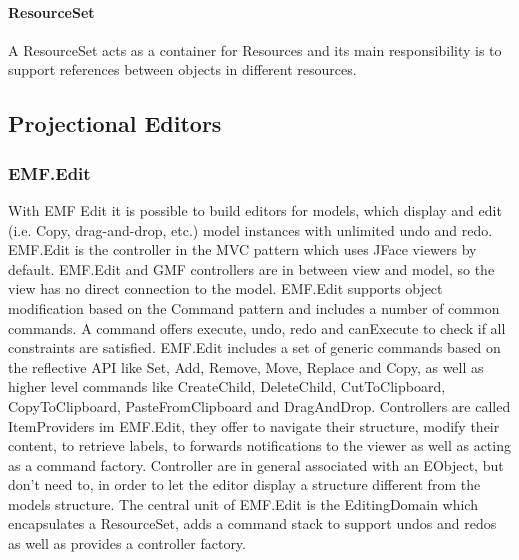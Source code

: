 \paragraph{ResourceSet}
A ResourceSet acts as a container for Resources and its main responsibility is to support references between objects in different resources. 

\subsection{Projectional Editors}
\subsubsection{EMF.Edit}
With EMF Edit it is possible to build editors for models, which display and edit (i.e. Copy, drag-and-drop, etc.) model instances with unlimited undo and redo. EMF.Edit is the controller in the MVC pattern which uses JFace viewers by default. EMF.Edit and GMF controllers are in between view and model, so the view has no direct connection to the model. EMF.Edit supports object modification based on the Command pattern and includes a number of common commands. A command  offers execute, undo, redo and canExecute to check if all constraints are satisfied.  EMF.Edit includes a set of generic commands based on the reflective API like Set, Add, Remove, Move, Replace and Copy, as well as  higher level commands like CreateChild, DeleteChild, CutToClipboard, CopyToClipboard, PasteFromClipboard and DragAndDrop. Controllers are called ItemProviders im EMF.Edit, they offer to navigate their structure, modify their content, to retrieve labels, to forwards notifications to the viewer as well as acting as a command factory. Controller are in general associated with an EObject, but don't need to, in order to let the editor display a structure different from the models structure. The central unit of EMF.Edit is the EditingDomain which encapsulates a ResourceSet, adds a command stack to support undos and redos as well as provides a controller factory. \cite{EMF2nd} 



